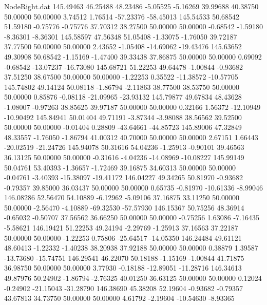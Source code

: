 \begin{filecontents}{NodeRight.dat}
 145.49463   46.25488   48.23486    -5.05525   -5.16269   39.99688   40.38750   50.00000   50.00000    3.74512    1.76514  -57.23376  -58.45013
 145.54533   50.68542   51.59180    -0.75776   -0.75776   37.70312   38.27500   50.00000   50.00000   -0.68542   -1.59180   -8.36301   -8.36301
 145.58597   47.56348   51.05408    -1.33075   -1.76050   39.72187   37.77500   50.00000   50.00000    2.43652   -1.05408  -14.69062  -19.43476
 145.63652   49.30908   50.68542    -1.15169   -1.47400   39.33438   37.86875   50.00000   50.00000    0.69092   -0.68542  -13.07237  -16.73080
 145.68721   51.22253   49.64478    -1.00844   -0.93682   37.51250   38.67500   50.00000   50.00000   -1.22253    0.35522  -11.38572  -10.57705
 145.74802   49.14124   50.08118    -1.86794   -2.11863   38.77500   38.53750   50.00000   50.00000    0.85876   -0.08118  -21.09965  -23.93132
 145.79877   49.67834   48.43628    -1.08007   -0.97263   38.85625   39.97187   50.00000   50.00000    0.32166    1.56372  -12.10949  -10.90492
 145.84941   50.01404   49.71191    -3.87344   -3.98088   38.56562   39.52500   50.00000   50.00000   -0.01404    0.28809  -43.64661  -44.85723
 145.89006   47.32849   48.33557    -1.76050   -1.86794   41.00312   40.70000   50.00000   50.00000    2.67151    1.66443  -20.02519  -21.24726
 145.94078   50.31616   54.04236    -1.25913   -0.90101   39.46563   36.13125   50.00000   50.00000   -0.31616   -4.04236  -14.08969  -10.08227
 145.99149   50.04761   53.40393    -1.36657   -1.72469   39.16875   34.60313   50.00000   50.00000   -0.04761   -3.40393  -15.38097  -19.41172
 146.04227   49.34265   50.81970    -0.93682   -0.79357   39.85000   36.03437   50.00000   50.00000    0.65735   -0.81970  -10.61336   -8.99046
 146.08286   52.56470   54.10889    -6.12962   -5.09106   37.16875   33.11250   50.00000   50.00000   -2.56470   -4.10889  -69.32530  -57.57930
 146.15367   50.75256   48.36914    -0.65032   -0.50707   37.56562   36.66250   50.00000   50.00000   -0.75256    1.63086   -7.16435   -5.58621
 146.19421   51.22253   49.24194    -2.29769   -1.25913   37.16563   37.22187   50.00000   50.00000   -1.22253    0.75806  -25.64517  -14.05350
 146.24484   49.61121   48.60413    -1.22332   -1.40238   38.20938   37.92188   50.00000   50.00000    0.38879    1.39587  -13.73680  -15.74751
 146.29541   46.22070   50.18188    -1.15169   -1.00844   41.71875   36.98750   50.00000   50.00000    3.77930   -0.18188  -12.89051  -11.28716
 146.34613   49.87976   50.24902    -1.86794   -2.76325   40.01250   36.63125   50.00000   50.00000    0.12024   -0.24902  -21.15043  -31.28790
 146.38690   45.38208   52.19604    -0.93682   -0.79357   43.67813   34.73750   50.00000   50.00000    4.61792   -2.19604  -10.54630   -8.93365

\end{filecontents}

